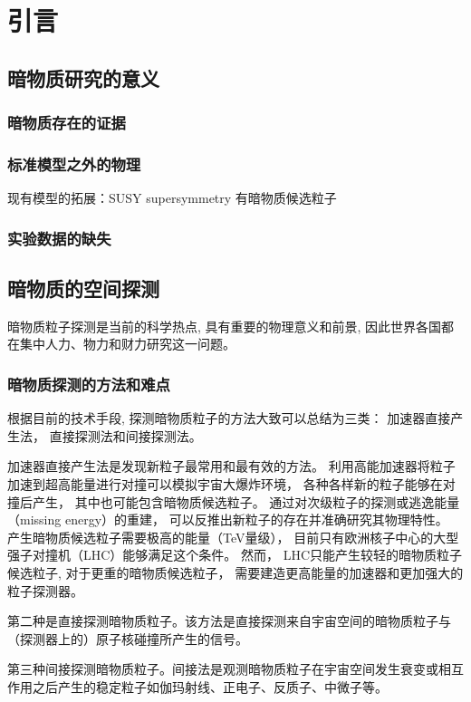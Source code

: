 \chapter{引言}

\section{暗物质研究的意义}
\subsection{暗物质存在的证据}

\subsection{标准模型之外的物理}
现有模型的拓展：SUSY supersymmetry 有暗物质候选粒子

\subsection{实验数据的缺失}

\section{暗物质的空间探测}
暗物质粒子探测是当前的科学热点, 具有重要的物理意义和前景, 因此世界各国都在集中人力、物力和财力研究这一问题。
\subsection{暗物质探测的方法和难点}
根据目前的技术手段, 探测暗物质粒子的方法大致可以总结为三类： 加速器直接产生法， 直接探测法和间接探测法。

加速器直接产生法是发现新粒子最常用和最有效的方法。
利用高能加速器将粒子加速到超高能量进行对撞可以模拟宇宙大爆炸环境， 各种各样新的粒子能够在对撞后产生， 其中也可能包含暗物质候选粒子。
通过对次级粒子的探测或逃逸能量（missing energy）的重建， 可以反推出新粒子的存在并准确研究其物理特性。
产生暗物质候选粒子需要极高的能量（TeV量级）， 目前只有欧洲核子中心的大型强子对撞机（LHC）能够满足这个条件。
然而， LHC只能产生较轻的暗物质粒子候选粒子, 对于更重的暗物质候选粒子， 需要建造更高能量的加速器和更加强大的粒子探测器。

第二种是直接探测暗物质粒子。该方法是直接探测来自宇宙空间的暗物质粒子与（探测器上的）原子核碰撞所产生的信号。

第三种间接探测暗物质粒子。间接法是观测暗物质粒子在宇宙空间发生衰变或相互作用之后产生的稳定粒子如伽玛射线、正电子、反质子、中微子等。

